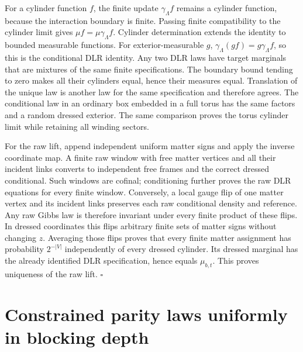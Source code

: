 For a cylinder function \(f\), the finite update
\(\gamma_\Lambda f\) remains a cylinder function, because the interaction
boundary is finite. Passing finite compatibility to the cylinder limit
gives \(\mu f=\mu\gamma_\Lambda f\). Cylinder determination extends the
identity to bounded measurable functions. For exterior-measurable \(g\),
\(\gamma_\Lambda(gf)=g\gamma_\Lambda f\), so this is the conditional
DLR identity. Any two DLR laws have target marginals that are mixtures of
the same finite specifications. The boundary bound tending to zero makes
all their cylinders equal, hence their measures equal. Translation of the
unique law is another law for the same specification and therefore agrees.
The conditional law in an ordinary box embedded in a full torus has the
same factors and a random dressed exterior. The same comparison proves the
torus cylinder limit while retaining all winding sectors.

For the raw lift, append independent uniform matter signs and apply the
inverse coordinate map. A finite raw window with free matter vertices and
all their incident links converts to independent free frames and the
correct dressed conditional. Such windows are cofinal; conditioning further
proves the raw DLR equations for every finite window. Conversely, a local
gauge flip of one matter vertex and its incident links preserves each raw
conditional density and reference. Any raw Gibbs law is therefore invariant
under every finite product of these flips. In dressed coordinates this
flips arbitrary finite sets of matter signs without changing \(z\).
Averaging those flips proves that every finite matter assignment has
probability \(2^{-|V|}\) independently of every dressed cylinder. Its
dressed marginal has the already identified DLR specification, hence equals
\(\mu_{b,t}\). This proves uniqueness of the raw lift.
\hfill\(\square\)

\section{Constrained parity laws uniformly in blocking depth}
\label{sec:rg-spatial-proof-constrained}

